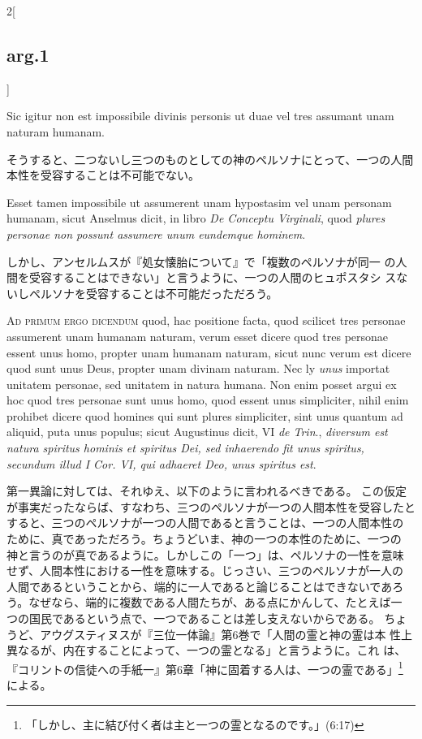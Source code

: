 \documentclass[paper=a4paper,fontsize=10pt,jafontsize=9pt,titlepage]{jlreq}
\begin{document}
\begin{paracol}{2}[\subsection{arg.1}]
\switchcolumn*

Sic igitur non est
impossibile divinis personis ut duae vel tres assumant unam naturam
humanam.

\switchcolumn

そうすると、二つないし三つのものとしての神のペルソナにとって、一つの人間
 本性を受容することは不可能でない。

\switchcolumn*

Esset tamen impossibile ut assumerent unam hypostasim vel unam
personam humanam, sicut Anselmus dicit, in libro {\itshape De Conceptu Virginali},
quod {\itshape plures personae non possunt assumere unum eundemque hominem}.

\switchcolumn

しかし、アンセルムスが『処女懐胎について』で「複数のペルソナが同一
 の人間を受容することはできない」と言うように、一つの人間のヒュポスタシ
 スないしペルソナを受容することは不可能だっただろう。

\switchcolumn*[\subsection{ad.1}]

{\scshape Ad primum ergo dicendum} quod, hac positione facta, quod scilicet tres
personae assumerent unam humanam naturam, verum esset dicere quod tres
personae essent unus homo, propter unam humanam naturam, sicut nunc
verum est dicere quod sunt unus Deus, propter unam divinam naturam. Nec
ly {\itshape unus} importat unitatem personae, sed unitatem in natura humana. Non
enim posset argui ex hoc quod tres personae sunt unus homo, quod essent
unus simpliciter, nihil enim prohibet dicere quod homines qui sunt
plures simpliciter, sint unus quantum ad aliquid, puta unus populus;
sicut Augustinus dicit, VI {\itshape de Trin}., {\itshape diversum est natura spiritus
hominis et spiritus Dei, sed inhaerendo fit unus spiritus, secundum
illud I Cor. VI, qui adhaeret Deo, unus spiritus est}.

\switchcolumn

第一異論に対しては、それゆえ、以下のように言われるべきである。
この仮定が事実だったならば、すなわち、三つのペルソナが一つの人間本性を受容したと
 すると、三つのペルソナが一つの人間であると言うことは、一つの人間本性の
 ために、真であっただろう。ちょうどいま、神の一つの本性のために、一つの
 神と言うのが真であるように。しかしこの「一つ」は、ペルソナの一性を意味
 せず、人間本性における一性を意味する。じっさい、三つのペルソナが一人の
 人間であるということから、端的に一人であると論じることはできないであろ
 う。なぜなら、端的に複数である人間たちが、ある点にかんして、たとえば一
 つの国民であるという点で、一つであることは差し支えないからである。
ちょうど、アウグスティヌスが『三位一体論』第6巻で「人間の霊と神の霊は本
 性上異なるが、内在することによって、一つの霊となる」と言うように。これ
 は、『コリントの信徒への手紙一』第6章「神に固着する人は、一つの霊である」\footnote{「しかし、主に結び付く者は主と一つの霊となるのです。」(6:17)} による。


\end{paracol}
\end{document}
